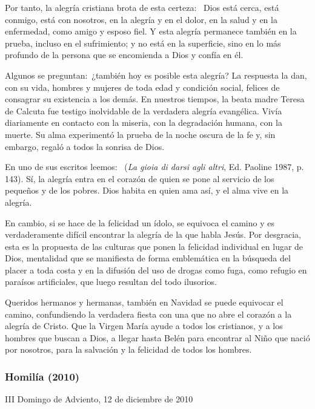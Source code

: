 Por tanto, la alegría cristiana brota de esta certeza:~ Dios está cerca, está conmigo, está con nosotros, en la alegría y en el dolor, en la salud y en la enfermedad, como amigo y esposo fiel. Y esta alegría permanece también en la prueba, incluso en el sufrimiento; y no está en la superficie, sino en lo más profundo de la persona que se encomienda a Dios y confía en él.

Algunos se preguntan:~¿también hoy es posible esta alegría? La respuesta la dan, con su vida, hombres y mujeres de toda edad y condición social, felices de consagrar su existencia a los demás. En nuestros tiempos, la beata madre Teresa de Calcuta fue testigo inolvidable de la verdadera alegría evangélica. Vivía diariamente en contacto con la miseria, con la degradación humana, con la muerte. Su alma experimentó la prueba de la noche oscura de la fe y, sin embargo, regaló a todos la sonrisa de Dios.

En uno de sus escritos leemos:~  (\emph{La gioia di darsi agli altri}, Ed. Paoline 1987, p. 143). Sí, la alegría entra en el corazón de quien se pone al servicio de los pequeños y de los pobres. Dios habita en quien ama así, y el alma vive en la alegría.

En cambio, si se hace de la felicidad un ídolo, se equivoca el camino y es verdaderamente difícil encontrar la alegría de la que habla Jesús. Por desgracia, esta es la propuesta de las culturas que ponen la felicidad individual en lugar de Dios, mentalidad que se manifiesta de forma emblemática en la búsqueda del placer a toda costa y en la difusión del uso de drogas como fuga, como refugio en paraísos artificiales, que luego resultan del todo ilusorios.

Queridos hermanos y hermanas, también en Navidad se puede equivocar el camino, confundiendo la verdadera fiesta con una que no abre el corazón a la alegría de Cristo. Que la Virgen María ayude a todos los cristianos, y a los hombres que buscan a Dios, a llegar hasta Belén para encontrar al Niño que nació por nosotros, para la salvación y la felicidad de todos los hombres.

\subsubsection{Homilía (2010)} III Domingo de Adviento, 12 de diciembre de 2010


